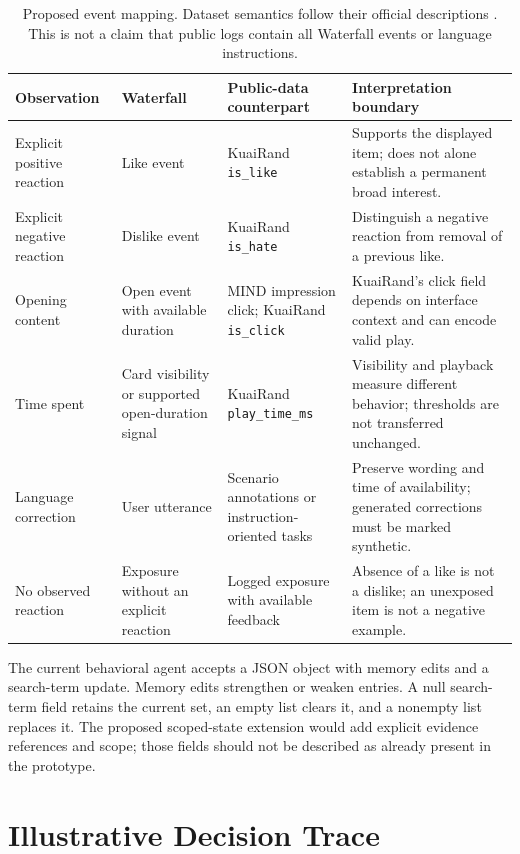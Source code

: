 \documentclass[11pt]{article}
\begin{document}
\begin{table}[t]
\centering
\begin{tabular}{>{\raggedright\arraybackslash}p{}>{\raggedright\arraybackslash}p{}>{\raggedright\arraybackslash}p{}>{\raggedright\arraybackslash}p{}}
\toprule
Observation & Waterfall & Public-data counterpart & Interpretation boundary \\
\midrule
Explicit positive reaction & Like event & KuaiRand \texttt{is\_like} & Supports the displayed item; does not alone establish a permanent broad interest. \\
Explicit negative reaction & Dislike event & KuaiRand \texttt{is\_hate} & Distinguish a negative reaction from removal of a previous like. \\
Opening content & Open event with available duration & MIND impression click; KuaiRand \texttt{is\_click} & KuaiRand's click field depends on interface context and can encode valid play. \\
Time spent & Card visibility or supported open-duration signal & KuaiRand \texttt{play\_time\_ms} & Visibility and playback measure different behavior; thresholds are not transferred unchanged. \\
Language correction & User utterance & Scenario annotations or instruction-oriented tasks & Preserve wording and time of availability; generated corrections must be marked synthetic. \\
No observed reaction & Exposure without an explicit reaction & Logged exposure with available feedback & Absence of a like is not a dislike; an unexposed item is not a negative example. \\
\bottomrule
\end{tabular}
\caption{Proposed event mapping. Dataset semantics follow their official descriptions \citep{gao2022kuairand,wu2020mind}. This is not a claim that public logs contain all Waterfall events or language instructions.}
\label{tab:events}
\end{table}

The current behavioral agent accepts a JSON object with memory edits and a search-term update. Memory edits strengthen or weaken entries. A null search-term field retains the current set, an empty list clears it, and a nonempty list replaces it. The proposed scoped-state extension would add explicit evidence references and scope; those fields should not be described as already present in the prototype.

\section{Illustrative Decision Trace}
\label{app:trace}
\end{document}
